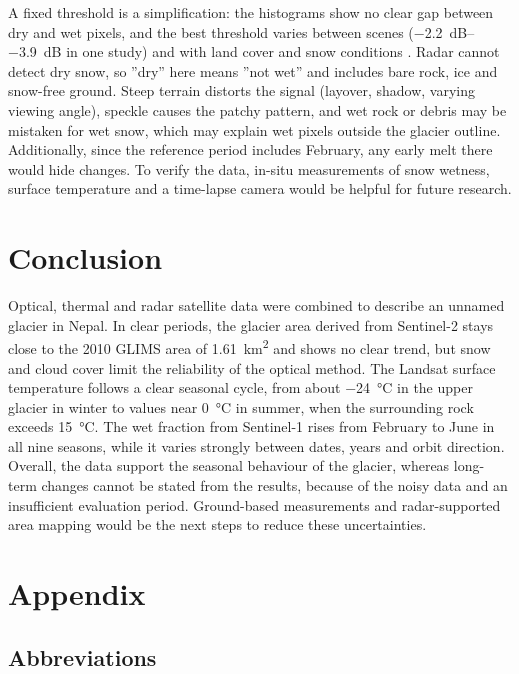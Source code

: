 \documentclass{article}
\begin{document}
A fixed threshold is a simplification: the histograms show no clear gap between dry and wet pixels, and the best threshold varies between scenes (\qtyrange{-2.2}{-3.9}{\dB} in one study) and with land cover and snow conditions \citep{torralbo_characterizing_2023, li_mapping_2025}. Radar cannot detect dry snow, so ''dry'' here means ''not wet'' and includes bare rock, ice and snow-free ground. Steep terrain distorts the signal (layover, shadow, varying viewing angle), speckle causes the patchy pattern, and wet rock or debris may be mistaken for wet snow, which may explain wet pixels outside the glacier outline. Additionally, since the reference period includes February, any early melt there would hide changes. To verify the data, in-situ measurements of snow wetness, surface temperature and a time-lapse camera would be helpful for future research.

\section{Conclusion}
Optical, thermal and radar satellite data were combined to describe an unnamed glacier in Nepal. In clear periods, the glacier area derived from Sentinel-2 stays close to the 2010 GLIMS area of \qty{1.61}{\km\squared} and shows no clear trend, but snow and cloud cover limit the reliability of the optical method. The Landsat surface temperature follows a clear seasonal cycle, from about \qty{-24}{\degreeCelsius} in the upper glacier in winter to values near \qty{0}{\degreeCelsius} in summer, when the surrounding rock exceeds \qty{15}{\degreeCelsius}. The wet fraction from Sentinel-1 rises from February to June in all nine seasons, while it varies strongly between dates, years and orbit direction. Overall, the data support the seasonal behaviour of the glacier, whereas long-term changes cannot be stated from the results, because of the noisy data and an insufficient evaluation period. Ground-based measurements and radar-supported area mapping would be the next steps to reduce these uncertainties.

\clearpage



\appendix
\section*{Appendix}
\renewcommand{\thesubsection}{\Alph{subsection}}

\subsection{Abbreviations}
\end{document}
